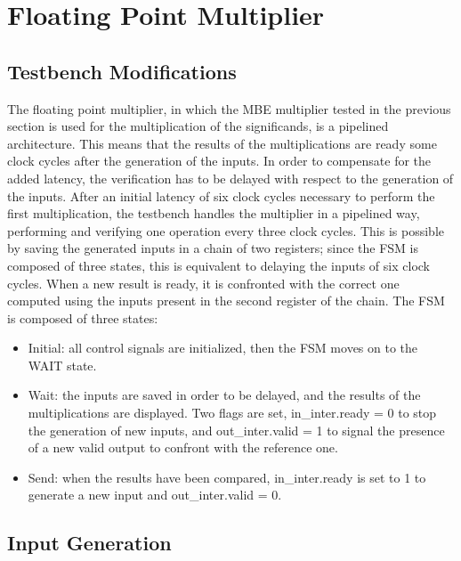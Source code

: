 %
\chapter{Floating Point Multiplier}
\label{cha4}

\section{Testbench Modifications}

The floating point multiplier, in which the MBE multiplier tested in the previous section is used for the multiplication of the significands, is a pipelined architecture. 
This means that the results of the multiplications are ready some clock cycles after the generation of the inputs. In order to compensate for the added latency, 
the verification has to be delayed with respect to the generation of the inputs.
After an initial latency of six clock cycles necessary to perform the first multiplication, the testbench handles the multiplier in a pipelined way, 
performing and verifying one operation every three clock cycles. This is possible by saving the generated inputs in a chain of two registers; since the FSM is composed
of three states, this is equivalent to delaying the inputs of six clock cycles. When a new result is ready, it is confronted with the correct one computed using the inputs 
present in the second register of the chain.
The FSM is composed of three states:

\begin{itemize}
    \item Initial: all control signals are initialized, then the FSM moves on to the WAIT state.
    \item Wait: the inputs are saved in order to be delayed, and the results of the multiplications are displayed. Two flags are set, in\_inter.ready = 0 
    to stop the generation of new inputs, and out\_inter.valid = 1 to signal the presence of a new valid output to confront with the reference one.
    \item Send: when the results have been compared, in\_inter.ready is set to 1 to generate a new input and out\_inter.valid = 0.
\end{itemize}

\section{Input Generation}


